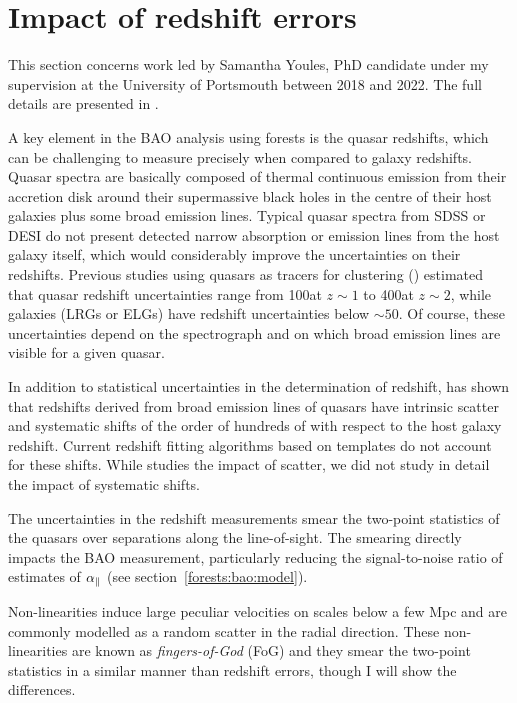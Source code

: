 \section{Impact of redshift errors}
\label{forests:zerrors}

This section concerns work led by Samantha Youles, PhD candidate under 
my supervision at the University of Portsmouth between 2018 and 2022. 
The full details are presented in \cite{youlesEffectQuasarRedshift2022a}. 

A key element in the BAO analysis using forests is the quasar redshifts, 
which can be challenging to measure precisely when compared to galaxy redshifts. 
Quasar spectra are basically composed of thermal continuous emission 
from their accretion disk around their supermassive
black holes in the centre of their host galaxies plus some broad emission lines. 
Typical quasar spectra from SDSS or DESI do not present detected narrow absorption or 
emission lines from the host galaxy itself, which would considerably improve the 
uncertainties on their redshifts. Previous studies using quasars as tracers for 
clustering (\cite{zarroukClusteringSDSSIVExtended2018, lykeSloanDigitalSky2020}) 
estimated that quasar redshift uncertainties range from 
100\kms at $z\sim 1$ to 400\kms at $z\sim 2$, while galaxies (LRGs or ELGs) have 
redshift uncertainties below $\sim 50$\kms. Of course, these uncertainties 
depend on the spectrograph and on which broad emission lines are visible
for a given quasar. 

In addition to statistical uncertainties in the determination of redshift, 
\cite{shenSloanDigitalSky2016} has shown that redshifts derived from 
broad emission lines of quasars have intrinsic scatter and systematic shifts
of the order of hundreds of \kms with respect to the host galaxy redshift. 
Current redshift fitting algorithms based on templates do not account for these shifts. 
While \cite{youlesEffectQuasarRedshift2022a} studies the impact of scatter, 
we did not study in detail the impact of systematic shifts. 


The uncertainties in the redshift measurements smear the two-point statistics 
of the quasars over separations along the line-of-sight. The smearing directly 
impacts the BAO measurement, particularly reducing the signal-to-noise ratio 
of estimates of ${\alpha_\parallel}$ (see section~\ref{forests:bao:model}). 

Non-linearities induce large peculiar velocities on scales below a few Mpc
and are commonly modelled as a random scatter in the radial direction.
These non-linearities are known as \emph{fingers-of-God} (FoG) and they smear
the two-point statistics in a similar manner than redshift errors, though 
I will show the differences. 

